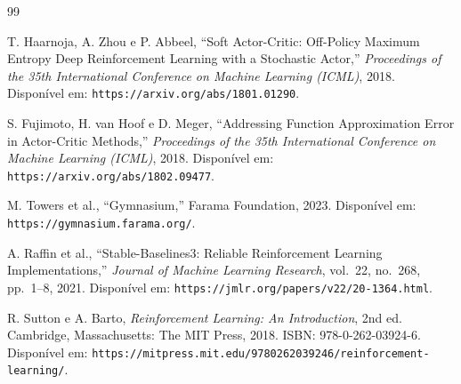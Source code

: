 \documentclass{Supervised_Reinforcement_Learningqsport}
\begin{document}
\begin{thebibliography}{99}

 T. Haarnoja, A. Zhou e P. Abbeel, ``Soft Actor-Critic: Off-Policy Maximum Entropy Deep Reinforcement Learning with a Stochastic Actor,'' \textit{Proceedings of the 35th International Conference on Machine Learning (ICML)}, 2018. Disponível em: \texttt{https://arxiv.org/abs/1801.01290}.

 S. Fujimoto, H. van Hoof e D. Meger, ``Addressing Function Approximation Error in Actor-Critic Methods,'' \textit{Proceedings of the 35th International Conference on Machine Learning (ICML)}, 2018. Disponível em: \texttt{https://arxiv.org/abs/1802.09477}.

 M. Towers et al., ``Gymnasium,'' Farama Foundation, 2023. Disponível em: \texttt{https://gymnasium.farama.org/}.

 A. Raffin et al., ``Stable-Baselines3: Reliable Reinforcement Learning Implementations,'' \textit{Journal of Machine Learning Research}, vol.~22, no.~268, pp.~1--8, 2021. Disponível em: \texttt{https://jmlr.org/papers/v22/20-1364.html}.

 R. Sutton e A. Barto, \textit{Reinforcement Learning: An Introduction}, 2nd ed. Cambridge, Massachusetts: The MIT Press, 2018. ISBN: 978-0-262-03924-6. Disponível em: \texttt{https://mitpress.mit.edu/9780262039246/reinforcement-\newline learning/}.

\end{thebibliography}
\end{document}
